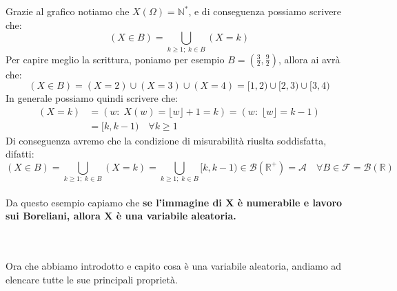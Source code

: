 \begin{figure}[H]
\centering
{}
\end{figure}

Grazie al grafico notiamo che $X(\Omega) = \mathbb{N^*}$, e di conseguenza possiamo scrivere che:
\[(X\in B) = \bigcup_{k\geq1; \;k\in B}(X=k)\]
Per capire meglio la scrittura, poniamo per esempio $B = (\frac{3}{2}, \frac{9}{2})$, allora ai avrà che:
\[(X\in B) = (X=2)\cup(X=3)\cup(X=4) = [1, 2)\cup [2, 3)\cup [3, 4)\]
In generale possiamo quindi scrivere che: 
\begin{align*}
    (X=k) &= \left(w:\;X(w) = \lfloor w\rfloor + 1 = k\right) = \left( w:\; \lfloor w\rfloor = k-1\right)\\
    &= [k, k-1)\quad \forall k \geq1
\end{align*}
Di conseguenza avremo che la condizione di misurabilità riuslta soddisfatta, difatti:
\[(X\in B) = \bigcup_{k\geq1; \;k\in B}(X=k) = \bigcup_{k\geq1; \;k\in B}[k, k-1)\in \mathcal{B}(\mathbb{R}^+) = \mathcal{A} \quad \forall B \in \mathcal{F} = \mathcal{B}(\mathbb{R})\]
\\
\noindent Da questo esempio capiamo che \textbf{se l'immagine di $\boldsymbol{X}$ è numerabile e lavoro sui Boreliani, allora $\boldsymbol{X}$ è una variabile aleatoria.}

\bigskip
\noindent
{}\\
\\
Ora che abbiamo introdotto e capito cosa è una variabile aleatoria, andiamo ad elencare tutte le sue principali proprietà.

